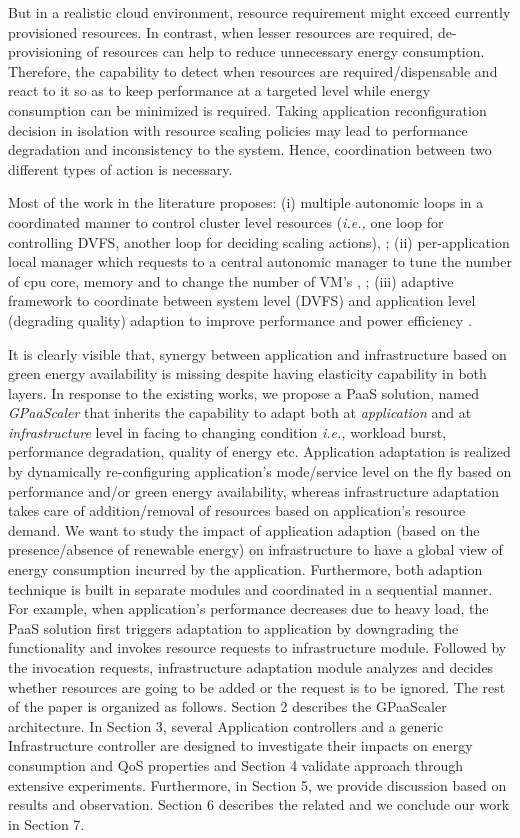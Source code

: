 But in a realistic cloud environment, resource requirement might exceed currently provisioned resources. In contrast, when lesser resources are required, de-provisioning of resources can help to reduce unnecessary energy consumption. Therefore, the capability to detect when resources are required/dispensable and react to it so as to keep performance at a targeted level while energy consumption can be minimized is required. Taking application reconfiguration decision in isolation with resource scaling policies may lead to performance degradation and inconsistency to the system. Hence, coordination between two different types of action is necessary.

Most of the work in the literature proposes: (i) multiple autonomic loops in a coordinated manner to control cluster level resources (\emph{i.e.,} one loop for controlling DVFS, another loop for deciding scaling actions)\cite{server-cluster}, \cite{shi}; (ii) per-application local manager which requests to a central autonomic manager to tune the number of cpu core, memory and to change the number of VM's \cite{morin1}, \cite{morin2}; (iii) adaptive framework to coordinate between system level (DVFS) and application level (degrading quality) adaption to improve performance and power efficiency \cite{adaptcap}.

It is clearly visible that, synergy between application and infrastructure based on green energy availability is missing despite having elasticity capability in both layers. In response to the existing works, we propose a PaaS solution, named \emph{GPaaScaler} that inherits the capability to adapt both at \emph{application} and at \emph{infrastructure} level in facing to changing condition \emph{i.e.,} workload burst, performance degradation, quality of energy etc. Application adaptation is realized by dynamically re-configuring application's mode/service level on the fly based on performance and/or green energy availability, whereas infrastructure adaptation takes care of addition/removal of resources based on application's resource demand. We want to study the impact of application adaption (based on the presence/absence of renewable energy) on infrastructure to have a global view of energy consumption incurred by the application.
Furthermore, both adaption technique is built in separate modules and coordinated in a sequential manner. For example, when application's performance decreases due to heavy load, the PaaS solution first triggers adaptation to application by downgrading the functionality and invokes resource requests to infrastructure module. Followed by the invocation requests, infrastructure adaptation module analyzes and decides whether resources are going to be added or the request is to be ignored. 
The rest of the paper is organized as follows. 
Section 2 describes the GPaaScaler architecture. In Section 3,
several Application controllers and a generic Infrastructure controller are designed to investigate
their impacts on energy consumption and QoS properties
and Section 4 validate approach through extensive experiments.
Furthermore, in Section 5, we provide discussion based on results and observation. Section 6 describes the related and we conclude our work in Section 7.